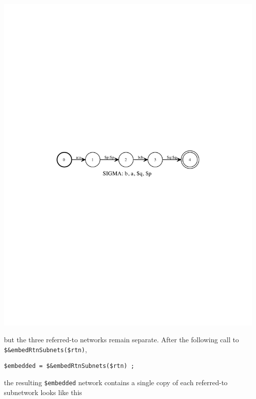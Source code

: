 \documentclass[letterpaper,12pt]{article}
\begin{document}
\begin{center}
\includegraphics[width=\textwidth]{images/sapTwoReferences.pdf}
\end{center}

\noindent
but the three referred-to networks remain separate.  After the following
call to \verb!$&embedRtnSubnets($rtn)!, 

\begin{Verbatim}[fontsize=\small]
$embedded = $&embedRtnSubnets($rtn) ;
\end{Verbatim}


\noindent
the resulting \verb!$embedded! network contains a single copy of each
referred-to subnetwork looks like this
\end{document}
